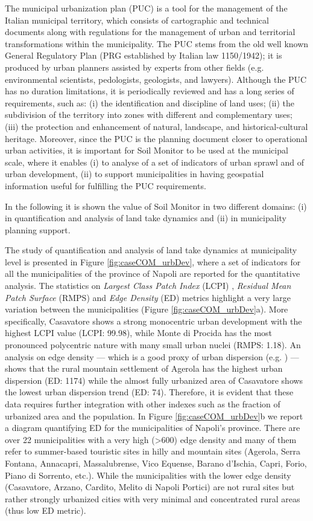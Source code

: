 \documentclass[APA,LATO1COL,doublespace]{WileyNJD-v2}
\begin{document}
The municipal urbanization plan (PUC) is a tool for the management of the Italian municipal territory, which consists of cartographic and technical documents along with regulations for the management of urban and territorial transformations within the municipality.
The PUC stems from the old well known General Regulatory Plan (PRG established by Italian law 1150/1942); it is produced by urban planners assisted by experts from other fields (e.g. environmental scientists, pedologists, geologists, and lawyers).
Although the PUC has no duration limitations, it is periodically reviewed and has a long series of requirements, such as: (i) the identification and discipline of land uses; (ii) the subdivision of the territory into zones with different and complementary uses; (iii) the protection and enhancement of natural, landscape, and historical-cultural heritage. 
Moreover, since the PUC is the planning document closer to operational urban activities, it is important for Soil Monitor to be used at the municipal scale, where it enables (i) to analyse of a set of indicators of urban sprawl and of urban development, (ii) to support municipalities in having geospatial information useful for fulfilling the PUC requirements.

In the following it is shown the value of Soil Monitor in two different domains: (i) in quantification and analysis of land take dynamics and (ii) in municipality planning support. 

The study of quantification and analysis of land take dynamics at municipality level is presented in Figure \ref{fig:caseCOM_urbDev}, where a set of indicators for all the municipalities of the province of Napoli are reported for the quantitative analysis.
The statistics on \textit{Largest Class Patch Index} (LCPI) , \textit{Residual Mean Patch Surface} (RMPS) and \textit{Edge Density} (ED) metrics highlight a very large variation between the municipalities (Figure \ref{fig:caseCOM_urbDev}a).
More specifically, Casavatore shows a strong monocentric urban development with the highest LCPI value (LCPI: 99.98), while Monte di Procida has the most pronounced
polycentric nature with many small urban nuclei (RMPS: 1.18).
An analysis on edge density --- which is a good proxy of urban dispersion (e.g. \citealp{SCHWARZ2010}) --- shows that the rural mountain settlement of Agerola has the highest urban dispersion (ED: 1174) while the almost fully urbanized area of Casavatore shows the lowest urban dispersion trend (ED: 74).
Therefore, it is evident that these data requires further integration with other indexes such as the fraction of urbanized area and the population.
In Figure \ref{fig:caseCOM_urbDev}b we report a diagram quantifying ED for the municipalities of Napoli's province.
There are over 22 municipalities with a very high (>600) edge density and many of them refer to summer-based touristic sites in hilly and mountain sites (Agerola, Serra Fontana, Annacapri, Massalubrense, Vico Equense, Barano d'Ischia, Capri, Forio, Piano di Sorrento, etc.).
While the municipalities with the lower edge density (Casavatore, Arzano, Cardito, Melito di Napoli Portici) are not rural sites but rather strongly urbanized cities with very minimal and concentrated rural areas (thus low ED metric).
\end{document}
